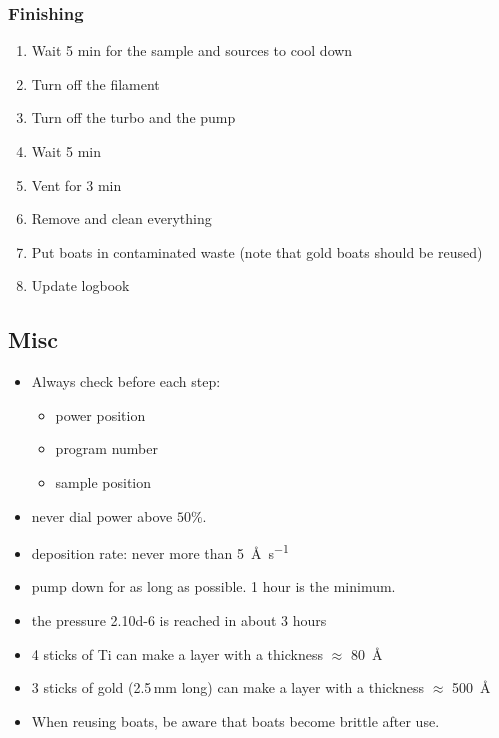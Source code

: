 \subsubsection{Finishing}
\begin{enumerate}[resume]
\item Wait 5 min for the sample and sources to cool down
\item Turn off the filament
\item Turn off the turbo and the pump
\item Wait 5 min
\item Vent for 3 min
\item Remove and clean everything
\item Put boats in contaminated waste (note that gold boats should be reused)
\item Update logbook
\end{enumerate}

\subsection{Misc}
\begin{itemize}
\item Always check before each step:
\begin{itemize}[noitemsep,nolistsep]
  \item power position
  \item program number
  \item sample position
\end{itemize}
\item never dial power above $50\%$.
\item deposition rate: never more than \SI{5}{\angstrom\per\second}
\item pump down for as long as possible. 1 hour is the minimum.
\item the pressure \SI{2.10d-6}{\torr} is reached in about 3 hours
\item 4 sticks of Ti can make a layer with a thickness $\approx$ \SI{80}{\angstrom}
\item 3 sticks of gold (2.5\,mm long) can make a layer with a thickness $\approx$ \SI{500}{\angstrom}
\item When reusing boats, be aware that boats become brittle after use.
\end{itemize}

\newpage


